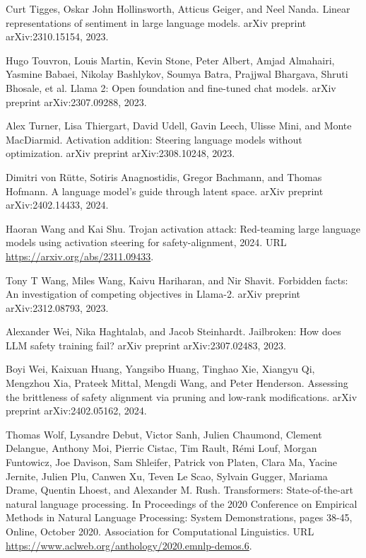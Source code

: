\documentclass[10pt]{article}
\begin{document}
Curt Tigges, Oskar John Hollinsworth, Atticus Geiger, and Neel Nanda. Linear representations of sentiment in large language models. arXiv preprint arXiv:2310.15154, 2023.

Hugo Touvron, Louis Martin, Kevin Stone, Peter Albert, Amjad Almahairi, Yasmine Babaei, Nikolay Bashlykov, Soumya Batra, Prajjwal Bhargava, Shruti Bhosale, et al. Llama 2: Open foundation and fine-tuned chat models. arXiv preprint arXiv:2307.09288, 2023.

Alex Turner, Lisa Thiergart, David Udell, Gavin Leech, Ulisse Mini, and Monte MacDiarmid. Activation addition: Steering language models without optimization. arXiv preprint arXiv:2308.10248, 2023.

Dimitri von Rütte, Sotiris Anagnostidis, Gregor Bachmann, and Thomas Hofmann. A language model's guide through latent space. arXiv preprint arXiv:2402.14433, 2024.

Haoran Wang and Kai Shu. Trojan activation attack: Red-teaming large language models using activation steering for safety-alignment, 2024. URL \href{https://arxiv.org/abs/2311.09433}{https://arxiv.org/abs/2311.09433}.

Tony T Wang, Miles Wang, Kaivu Hariharan, and Nir Shavit. Forbidden facts: An investigation of competing objectives in Llama-2. arXiv preprint arXiv:2312.08793, 2023.

Alexander Wei, Nika Haghtalab, and Jacob Steinhardt. Jailbroken: How does LLM safety training fail? arXiv preprint arXiv:2307.02483, 2023.

Boyi Wei, Kaixuan Huang, Yangsibo Huang, Tinghao Xie, Xiangyu Qi, Mengzhou Xia, Prateek Mittal, Mengdi Wang, and Peter Henderson. Assessing the brittleness of safety alignment via pruning and low-rank modifications. arXiv preprint arXiv:2402.05162, 2024.

Thomas Wolf, Lysandre Debut, Victor Sanh, Julien Chaumond, Clement Delangue, Anthony Moi, Pierric Cistac, Tim Rault, Rémi Louf, Morgan Funtowicz, Joe Davison, Sam Shleifer, Patrick von Platen, Clara Ma, Yacine Jernite, Julien Plu, Canwen Xu, Teven Le Scao, Sylvain Gugger, Mariama Drame, Quentin Lhoest, and Alexander M. Rush. Transformers: State-of-the-art natural language processing. In Proceedings of the 2020 Conference on Empirical Methods in Natural Language Processing: System Demonstrations, pages 38-45, Online, October 2020. Association for Computational Linguistics. URL \href{https://www.aclweb.org/anthology/2020.emnlp-demos.6}{https://www.aclweb.org/anthology/2020.emnlp-demos.6}.
\end{document}

